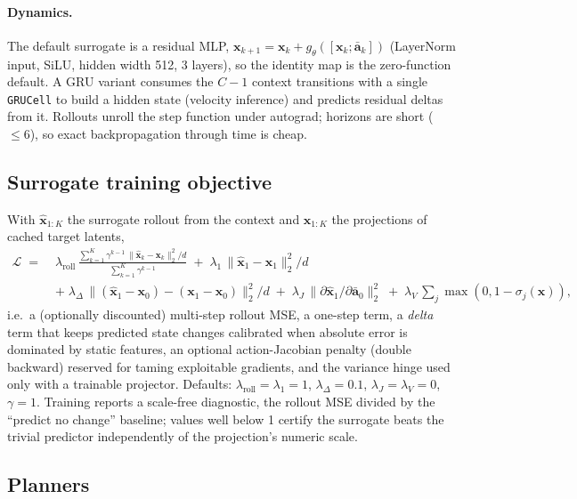 \documentclass[11pt,a4paper]{article}
\newcommand{\xloc}{\mathbf{x}}
\newcommand{\abar}{\bar{\mathbf{a}}}
\begin{document}
\paragraph{Dynamics.} The default surrogate is a residual MLP,
$\xloc_{k+1} = \xloc_k + g_\theta([\xloc_k;\abar_k])$ (LayerNorm input, SiLU,
hidden width 512, 3 layers), so the identity map is the zero-function default.
A GRU variant consumes the $C{-}1$ context transitions with a single
\texttt{GRUCell} to build a hidden state (velocity inference) and predicts
residual deltas from it. Rollouts unroll the step function under autograd;
horizons are short ($\le 6$), so exact backpropagation through time is cheap.

\subsection{Surrogate training objective}
\label{sec:loss}

With $\hat{\xloc}_{1:K}$ the surrogate rollout from the context and
$\xloc_{1:K}$ the projections of cached target latents,
\begin{align}
\mathcal{L} \;=\;& \lambda_{\mathrm{roll}}\,
  \frac{\sum_{k=1}^{K} \gamma^{k-1}\,\lVert \hat{\xloc}_k - \xloc_k \rVert_2^2 / d}
       {\sum_{k=1}^{K} \gamma^{k-1}}
  \;+\; \lambda_{1}\,\lVert \hat{\xloc}_1 - \xloc_1 \rVert_2^2 / d \nonumber\\
  &+\; \lambda_{\Delta}\,\lVert (\hat{\xloc}_1 - \xloc_0) - (\xloc_1 - \xloc_0) \rVert_2^2 / d
  \;+\; \lambda_{J}\,\big\lVert \partial \hat{\xloc}_1 / \partial \abar_0 \big\rVert_2^2
  \;+\; \lambda_{V}\, \textstyle\sum_j \max(0, 1 - \sigma_j(\xloc)) ,
\label{eq:loss}
\end{align}
i.e.\ a (optionally discounted) multi-step rollout MSE, a one-step term, a
\emph{delta} term that keeps predicted state changes calibrated when absolute
error is dominated by static features, an optional action-Jacobian penalty
(double backward) reserved for taming exploitable gradients, and the variance
hinge used only with a trainable projector. Defaults:
$\lambda_{\mathrm{roll}}{=}\lambda_1{=}1$, $\lambda_\Delta{=}0.1$,
$\lambda_J{=}\lambda_V{=}0$, $\gamma{=}1$. Training reports a scale-free
diagnostic, the rollout MSE divided by the ``predict no change'' baseline;
values well below 1 certify the surrogate beats the trivial predictor
independently of the projection's numeric scale.

\subsection{Planners}
\label{sec:planners}
\end{document}
